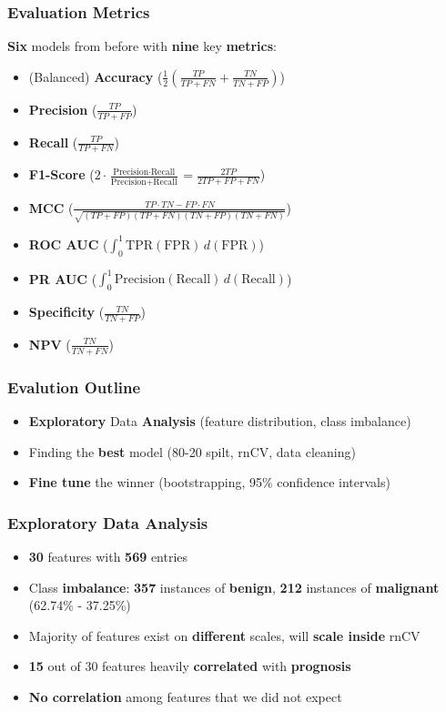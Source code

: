 \documentclass{beamer}
\begin{document}
\begin{frame}
	\frametitle{Evaluation Metrics}
	\textbf{Six} models from before with \textbf{nine} key \textbf{metrics}:
	\begin{itemize}
		\item (Balanced) \textbf{Accuracy} ($\frac{1}{2}
		\left(
		\frac{TP}{TP + FN}
		+
		\frac{TN}{TN + FP}
		\right)$)
		\item \textbf{Precision} ($\frac{TP}{TP + FP}$)
		\item \textbf{Recall} ($\frac{TP}{TP + FN}$)
		\item \textbf{F1-Score} ($2 \cdot \frac{\text{Precision} \cdot \text{Recall}}
		{\text{Precision} + \text{Recall}}
		= \frac{2TP}{2TP + FP + FN}$)
		\item \textbf{MCC} ($\frac{TP \cdot TN - FP \cdot FN}
		{\sqrt{(TP + FP)(TP + FN)(TN + FP)(TN + FN)}}$)
		\item \textbf{ROC AUC} ($\int_{0}^{1} \text{TPR}(\text{FPR}) \, d(\text{FPR})$)
		\item \textbf{PR AUC} ($\int_{0}^{1} \text{Precision}(\text{Recall}) \, d(\text{Recall})$)
		\item \textbf{Specificity} ($\frac{TN}{TN + FP}$)
		\item \textbf{NPV} ($\frac{TN}{TN + FN}$)
	\end{itemize}
\end{frame}

\begin{frame}
	\frametitle{Evalution Outline}
	\begin{itemize}
		\item \textbf{Exploratory} Data \textbf{Analysis} (feature distribution, class imbalance)
		\item Finding the \textbf{best} model (80-20 spilt, rnCV, data cleaning)
		\item \textbf{Fine tune} the winner (bootstrapping, 95\% confidence intervals)
	\end{itemize}
\end{frame}

\begin{frame}
	\frametitle{Exploratory Data Analysis}
	\begin{itemize}
		\item \textbf{30} features with \textbf{569} entries
		\item Class \textbf{imbalance}: \textbf{357} instances of \textbf{benign}, \textbf{212} instances of \textbf{malignant} (62.74\% - 37.25\%)
		\item Majority of features exist on \textbf{different} scales, will \textbf{scale inside} rnCV
		\item \textbf{15} out of 30 features heavily \textbf{correlated} with \textbf{prognosis}
		\item \textbf{No correlation} among features that we did not expect
	\end{itemize}
\end{frame}
\end{document}
